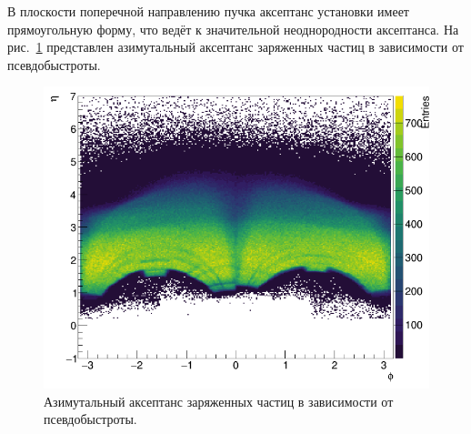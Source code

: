 В плоскости поперечной направлению пучка аксептанс установки имеет прямоугольную форму, что ведёт к значительной неоднородности аксептанса.
На рис.~\ref{fig:bmn_phi_eta} представлен азимутальный аксептанс заряженных частиц в зависимости от псевдобыстроты. 
%
\begin{figure}[ht]
\begin{center}
\includegraphics[width=0.75\linewidth]{images/bmn_phi_eta.png}
\caption{Азимутальный аксептанс заряженных частиц в зависимости от псевдобыстроты.}
\label{fig:bmn_phi_eta}
\end{center}
\end{figure}

